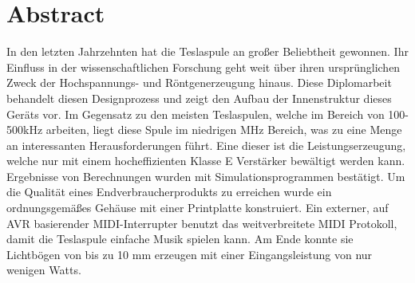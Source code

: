 \vspace{3cm}

\begingroup
\let\clearpage\relax
\chapter*{Abstract}
\endgroup

In den letzten Jahrzehnten hat die Teslaspule an großer Beliebtheit gewonnen. Ihr Einfluss in der wissenschaftlichen Forschung geht weit über ihren ursprünglichen Zweck der Hochspannungs- und Röntgenerzeugung hinaus. Diese Diplomarbeit behandelt diesen Designprozess und zeigt den Aufbau der Innenstruktur dieses Geräts vor. Im Gegensatz zu den meisten Teslaspulen, welche im Bereich von 100-500kHz arbeiten, liegt diese Spule im niedrigen MHz Bereich, was zu eine Menge an interessanten Herausforderungen führt. Eine dieser ist die Leistungserzeugung, welche nur mit einem hocheffizienten Klasse E Verstärker bewältigt werden kann. Ergebnisse von Berechnungen wurden mit Simulationsprogrammen bestätigt. Um die Qualität eines Endverbraucherprodukts zu erreichen wurde ein ordnungsgemäßes Gehäuse mit einer Printplatte konstruiert. Ein externer, auf AVR basierender MIDI-Interrupter benutzt das weitverbreitete MIDI Protokoll, damit die Teslaspule einfache Musik spielen kann. Am Ende konnte sie Lichtbögen von bis zu 10 mm erzeugen mit einer Eingangsleistung von nur wenigen Watts.